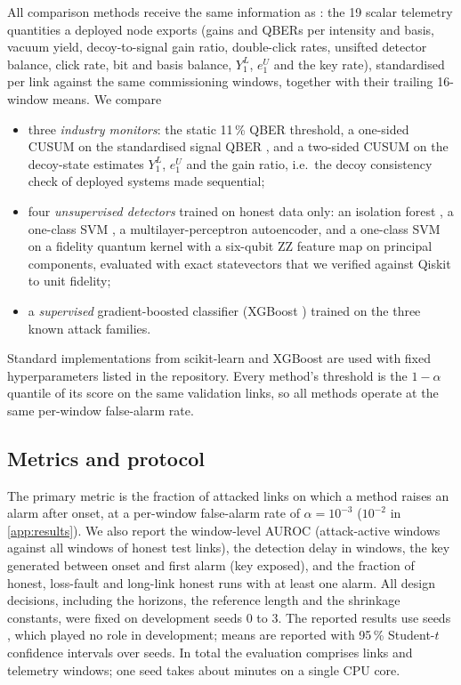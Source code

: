 All comparison methods receive the same information as \qtrace{}: the 19 scalar telemetry quantities a deployed node exports (gains and QBERs per intensity and basis, vacuum yield, decoy-to-signal gain ratio, double-click rates, unsifted detector balance, click rate, bit and basis balance, $Y_1^L$, $e_1^U$ and the key rate), standardised per link against the same commissioning windows, together with their trailing 16-window means. We compare
\begin{itemize}
\item three \emph{industry monitors}: the static 11\,\% QBER threshold, a one-sided CUSUM on the standardised signal QBER \cite{Page1954}, and a two-sided CUSUM on the decoy-state estimates $Y_1^L$, $e_1^U$ and the gain ratio, i.e.\ the decoy consistency check of deployed systems made sequential;
\item four \emph{unsupervised detectors} trained on honest data only: an isolation forest \cite{Liu2008IF}, a one-class SVM \cite{Scholkopf2001}, a multilayer-perceptron autoencoder, and a one-class SVM on a fidelity quantum kernel \cite{Havlicek2019,SchuldKilloran2019} with a six-qubit ZZ feature map on principal components, evaluated with exact statevectors that we verified against Qiskit \cite{Qiskit2024} to unit fidelity;
\item a \emph{supervised} gradient-boosted classifier (XGBoost \cite{ChenGuestrin2016}) trained on the three known attack families.
\end{itemize}
Standard implementations from scikit-learn \cite{Pedregosa2011} and XGBoost are used with fixed hyperparameters listed in the repository. Every method's threshold is the $1-\alpha$ quantile of its score on the same validation links, so all methods operate at the same per-window false-alarm rate.

\subsection{Metrics and protocol}\label{sec:metrics}

The primary metric is the fraction of attacked links on which a method raises an alarm after onset, at a per-window false-alarm rate of $\alpha=10^{-3}$ ($10^{-2}$ in \cref{app:results}). We also report the window-level AUROC (attack-active windows against all windows of honest test links), the detection delay in windows, the key generated between onset and first alarm (key exposed), and the fraction of honest, loss-fault and long-link honest runs with at least one alarm. All design decisions, including the horizons, the reference length and the shrinkage constants, were fixed on development seeds 0 to 3. The reported results use seeds \SeedList{}, which played no role in development; means are reported with 95\,\% Student-$t$ confidence intervals over seeds. In total the evaluation comprises \NRunsTotal{} links and \NWindowsTotal{} telemetry windows; one seed takes about \WallPerSeed{} minutes on a single CPU core.
